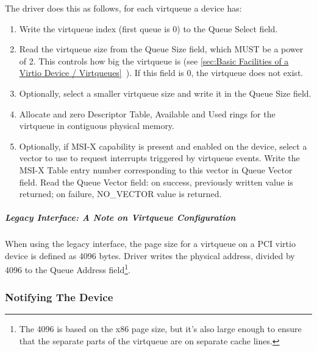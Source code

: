 The driver does this as follows, for each virtqueue a device has:

\begin{enumerate}
\item Write the virtqueue index (first queue is 0) to the Queue
  Select field.

\item Read the virtqueue size from the Queue Size field, which MUST
   be a power of 2. This controls how big the virtqueue is
  (see \ref{sec:Basic Facilities of a Virtio Device / Virtqueues}~). If this field is 0, the virtqueue does not exist.

\item Optionally, select a smaller virtqueue size and write it in the Queue Size
   field.

\item Allocate and zero Descriptor Table, Available and Used rings for the
   virtqueue in contiguous physical memory.

\item Optionally, if MSI-X capability is present and enabled on the
  device, select a vector to use to request interrupts triggered
  by virtqueue events. Write the MSI-X Table entry number
  corresponding to this vector in Queue Vector field. Read the
  Queue Vector field: on success, previously written value is
  returned; on failure, NO_VECTOR value is returned.
\end{enumerate}

\subparagraph{Legacy Interface: A Note on Virtqueue Configuration}\label{sec:Virtio Transport Options / Virtio Over PCI Bus / PCI-specific Initialization And Device Operation / Device Initialization / Virtqueue Configuration / Legacy Interface: A Note on Virtqueue Configuration}
When using the legacy interface, the page size for a virtqueue on a PCI virtio
device is defined as 4096 bytes.  Driver writes the physical address, divided
by 4096 to the Queue Address field\footnote{The 4096 is based on the x86 page size, but it's also large
enough to ensure that the separate parts of the virtqueue are on
separate cache lines.
}.

\subsubsection{Notifying The Device}\label{sec:Virtio Transport Options / Virtio Over PCI Bus / PCI-specific Initialization And Device Operation / Notifying The Device}


